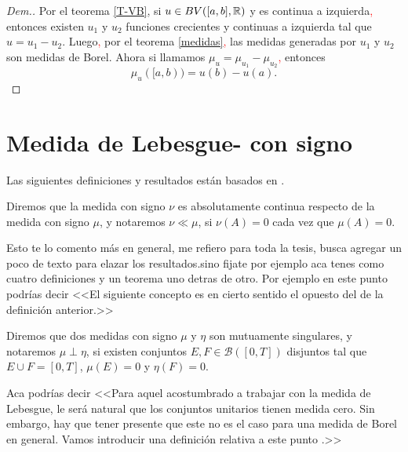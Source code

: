 \begin{proof}[Dem.]
Por el teorema \ref{T-VB}, si $u\in BV([a,b],\mathbb{R})$ y es continua a izquierda\textcolor{red}{,} entonces existen $u_1$ y $u_2$ funciones crecientes y continuas a izquierda tal que $u=u_1-u_2$. Luego\textcolor{red}{,} por el teorema \ref{medidas}\textcolor{red}{,}  las medidas generadas por $u_1$ y $u_2$ son medidas de Borel. Ahora si llamamos  $\mu_u=\mu_{u_1}-\mu_{u_2}$\textcolor{red}{,}   entonces
$$\mu_{u}([a,b))=u(b)-u(a).$$
\end{proof}


\section{Medida de Lebesgue- con signo}

Las siguientes definiciones y resultados están basados en \cite[Capitulo 3]{folland}.

\begin{defi}
	Diremos que la medida con signo $\nu$ es absolutamente continua  respecto de la medida con signo $\mu$, y  notaremos $\nu\ll\mu$\index[Simbolo]{$\ll$}, si $\nu(A)=0$ cada vez que  $\mu(A)=0$. \normalmarginpar {}
\end{defi}


{\color{green}
 Esto te lo comento más en general, me refiero para toda la tesis, busca agregar un poco de texto para elazar los resultados.sino fijate por ejemplo aca tenes como cuatro definiciones y un teorema uno detras de otro. Por ejemplo en este punto podrías decir <<El siguiente concepto es en cierto sentido el opuesto del de la definición anterior.>> 
}

\begin{defi}
	Diremos que dos medidas con signo $\mu$ y $\eta$ son mutuamente singulares, y  notaremos $\mu\perp \eta$,  si existen conjuntos $E,F\in\mathscr{B}([0,T])$ disjuntos tal que $E\cup F=[0,T]$, $\mu(E)=0$ y $\eta(F)=0$. \index[Simbolo]{$\perp$}\normalmarginpar{}
\end{defi}

{\color{green} Aca podrías decir <<Para aquel acostumbrado a trabajar con la medida de Lebesgue, le será natural que los conjuntos unitarios tienen medida cero. Sin embargo, hay que tener presente que este no es el caso para una medida de Borel en general. Vamos introducir una definición relativa a este punto  .>>}

